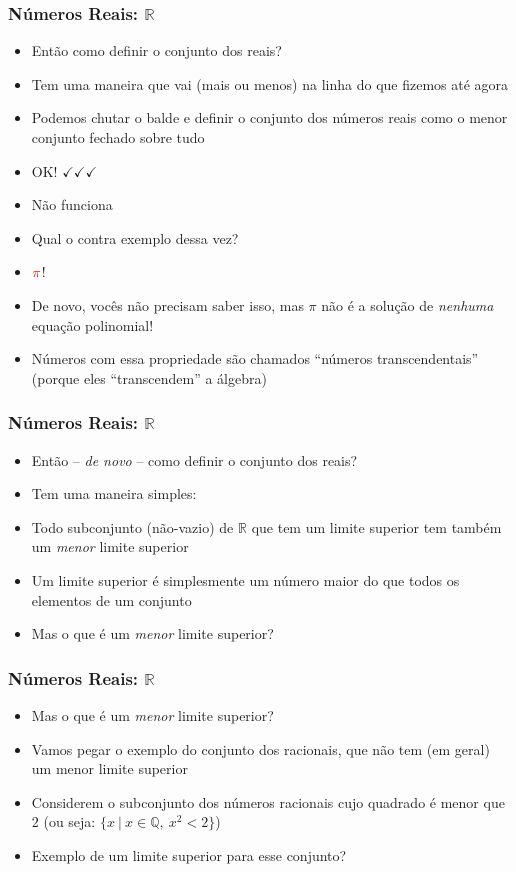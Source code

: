 \documentclass[usenames,dvipsnames,svgnames]{beamer}
\begin{document}
\begin{frame}
	
	\frametitle{Números Reais: $\mathbb{R}$}

	\begin{itemize}
		\item Então como definir o conjunto dos reais?
		\item Tem uma maneira que vai (mais ou menos) na linha do que fizemos até agora
		\item Podemos chutar o balde e definir o conjunto dos números reais como o menor conjunto fechado sobre tudo
		\item {\color{ForestGreen}OK! $\checkmark\checkmark\checkmark$}
		\item {\color{red} Não funciona}
		\item Qual o contra exemplo dessa vez?
		\item $\color{red}\pi$!
		\item De novo, vocês não precisam saber isso, mas $\pi$ não é a solução de \emph{nenhuma} equação polinomial!
		\item Números com essa propriedade são chamados ``números transcendentais'' (porque eles ``transcendem'' a álgebra)
	\end{itemize}

\end{frame}

\begin{frame}
	
	\frametitle{Números Reais: $\mathbb{R}$}

	\begin{itemize}
		\item Então -- \emph{de novo} -- como definir o conjunto dos reais?
		\item Tem uma maneira simples:
		\item Todo subconjunto (não-vazio) de $\mathbb{R}$ que tem um limite superior tem também um \emph{menor} limite superior
		\item Um limite superior é simplesmente um número maior do que todos os elementos de um conjunto
		\item Mas o que é um \emph{menor} limite superior?
	\end{itemize}

\end{frame}

\begin{frame}
	
	\frametitle{Números Reais: $\mathbb{R}$}

	\begin{itemize}
		\item Mas o que é um \emph{menor} limite superior?
		\item Vamos pegar o exemplo do conjunto dos racionais, que não tem (em geral) um menor limite superior
		\item Considerem o subconjunto dos números racionais cujo quadrado é menor que $2$ (ou seja: $\{x ~|~ x \in \mathbb{Q},~ x^2 < 2\}$)
		\item Exemplo de um limite superior para esse conjunto?
	\end{itemize}

\end{frame}
\end{document}
